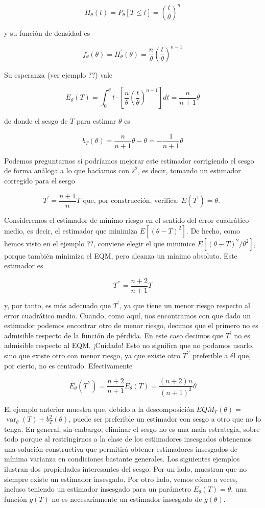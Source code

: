 \documentclass[
]{article}
\begin{document}
\[
H_{\theta}(t)=P_{\theta}[T \leq t]=\left(\frac{t}{\theta}\right)^{n}
\]

y su función de densidad es

\[
f_{\theta}(\theta)=H_{\theta}^{\prime}(\theta)=\frac{n}{\theta}\left(\frac{t}{\theta}\right)^{n-1}
\]

Su esperanza (ver ejemplo ??) vale

\[
E_{\theta}(T)=\int_{0}^{\theta} t \cdot\left[\frac{n}{\theta}\left(\frac{t}{\theta}\right)^{n-1}\right] d t=\frac{n}{n+1} \theta
\]

de donde el sesgo de \(T\) para estimar \(\theta\) es

\[
b_{T}(\theta)=\frac{n}{n+1} \theta-\theta=-\frac{1}{n+1} \theta
\]

Podemos preguntarnos si podríamos mejorar este estimador corrigiendo el sesgo de forma análoga a lo que hacíamos con \(\hat{s}^{2}\), es decir, tomando un estimador corregido para el sesgo

\[
T^{\prime}=\frac{n+1}{n} T \text { que, por construcción, verifica: } E\left(T^{\prime}\right)=\theta \text {. }
\]

Consideremos el estimador de mínimo riesgo en el sentido del error cuadrático medio, es decir, el estimador que minimiza \(E\left[(\theta-T)^{2}\right]\). De hecho, como hemos visto en el ejemplo ??, conviene elegir el que minimice \(E\left[(\theta-T)^{2} / \theta^{2}\right]\), porque también minimiza el EQM, pero alcanza un mínimo absoluto. Este estimador es

\[
T^{\prime \prime}=\frac{n+2}{n+1} T
\]

y, por tanto, es más adecuado que \(T^{\prime}\), ya que tiene un menor riesgo respecto al error cuadrático medio.
Cuando, como aquí, nos encontramos con que dado un estimador podemos encontrar otro de menor riesgo, decimos que el primero no es admisible respecto de la función de pérdida. En este caso decimos que \(T^{\prime}\) no es admisible respecto al EQM. ¡Cuidado! Esto no significa que no podamos usarlo, sino que existe otro con menor riesgo, ya que existe otro \(T^{\prime \prime}\) preferible a él que, por cierto, no es centrado. Efectivamente

\[
E_{\theta}\left(T^{\prime \prime}\right)=\frac{n+2}{n+1} E_{\theta}(T)=\frac{(n+2) n}{(n+1)^{2}} \theta
\]

El ejemplo anterior muestra que, debido a la descomposición \(E Q M_{T}(\theta)=\) \(\operatorname{var}_{\theta}(T)+b_{T}^{2}(\theta)\), puede ser preferible un estimador con sesgo a otro que no lo tenga.
En general, sin embargo, eliminar el sesgo no es una mala estrategia, sobre todo porque al restringirnos a la clase de los estimadores insesgados obtenemos una solución constructiva que permitirá obtener estimadores insesgados de mínima varianza en condiciones bastante generales.
Los siguientes ejemplos ilustran dos propiedades interesantes del sesgo. Por un lado, muestran que no siempre existe un estimador insesgado. Por otro lado, vemos cómo a veces, incluso teniendo un estimador insesgado para un parámetro \(E_{\theta}(T)=\theta\), una función \(g(T)\) no es necesariamente un estimador insesgado de \(g(\theta)\).
\end{document}

